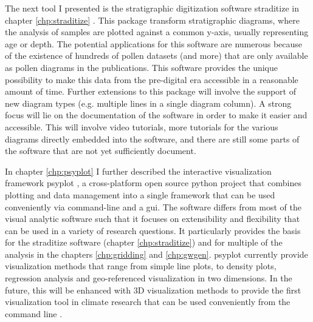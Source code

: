 \begin{refsection}
The next tool I presented is the stratigraphic digitization software straditize in chapter \ref{chp:straditize} \citep{SommerRechChevalierEtAl2019}. This package transform stratigraphic diagrams, where the analysis of samples are plotted against a common y-axis, usually representing age or depth. The potential applications for this software are numerous because of the existence of hundreds of pollen datasets (and more) that are only available as pollen diagrams in the publications. This software provides the unique possibility to make this data from the pre-digital era accessible in a reasonable amount of time. Further extensions to this package will involve the support of new diagram types (e.g. multiple lines in a single diagram column). A strong focus will lie on the documentation of the software in order to make it easier and accessible. This will involve video tutorials, more tutorials for the various diagrams directly embedded into the software, and there are still some parts of the software that are not yet sufficiently document.

In chapter \ref{chp:psyplot} I further described the interactive visualization framework psyplot \citep{Sommer2017}, a cross-platform open source python project that combines plotting and data management into a single framework that can be used conveniently via command-line and a \gls{gui}. The software differs from most of the visual analytic software such that it focuses on extensibility and flexibility that can be used in a variety of research questions. It particularly provides the basis for the straditize software (chapter \ref{chp:straditize}) and for multiple of the analysis in the chapters \ref{chp:gridding} and \ref{chp:gwgen}. psyplot currently provide visualization methods that range from simple line plots, to density plots, regression analysis and geo-referenced visualization in two dimensions. In the future, this will be enhanced with 3D visualization methods to provide the first visualization tool in climate research that can be used conveniently from the command line \citep{Sommer2019a}. 


\end{refsection}
